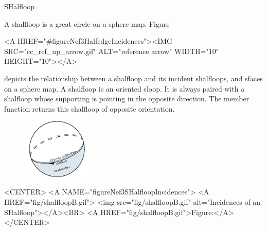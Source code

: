
\ccRefPageBegin



\begin{ccRefClass}{SHalfloop}

\ccDefinition

A shalfloop is a great circle on a sphere map. 
Figure~\begin{ccHtmlOnly}
  <A HREF="#figureNef3HalfedgeIncidences"><IMG 
  SRC="cc_ref_up_arrow.gif" ALT="reference arrow" WIDTH="10" HEIGHT="10"></A>
\end{ccHtmlOnly}
depicts the relationship between a shalfloop and its incident
shalfloops, and sfaces on a sphere map.  A shalfloop is 
an oriented sloop. It is always paired with a 
shalfloop whose supporting  is pointing in
the opposite direction. The  member function returns
this shalfloop of opposite orientation.

\begin{ccTexOnly}
    \begin{figure}[bht]
        \begin{center}
          \parbox{0.3\textwidth}{%
              \includegraphics[width=0.3\textwidth]{Nef_3_ref/fig/shalfloopB}%
          }
        \end{center}
        \label{figureNef3HalfloopIncidences}
    \end{figure}
\end{ccTexOnly}

\begin{ccHtmlOnly}
    <CENTER>
    <A NAME="figureNef3SHalfloopIncidences">
    <A HREF="fig/shalfloopB.gif">
        <img src="fig/shalfloopB.gif" 
             alt="Incidences of an SHalfloop"></A><BR>
    <A HREF="fig/shalfloopB.gif">Figure:</A>
    </CENTER>
\end{ccHtmlOnly}


\end{ccRefClass}
